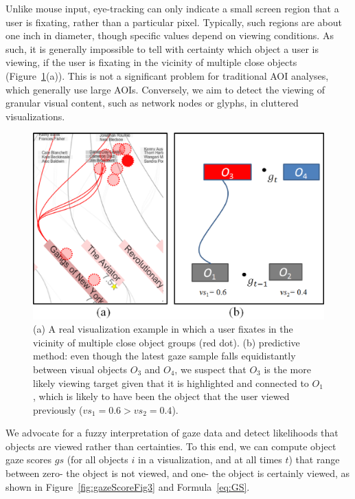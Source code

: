 Unlike mouse input, eye-tracking can only indicate a small screen region that a user is fixating, rather than a particular pixel. Typically, such regions are about one inch in diameter, though specific values depend on viewing conditions. As such, it is generally impossible to tell with certainty which object a user is viewing, if the user is fixating in the vicinity of multiple close objects (Figure~\ref{fig:discreminateFig4}(a)). This is not a significant problem for traditional AOI analyses, which generally use large AOIs. Conversely, we aim to detect the viewing of granular visual content, such as network nodes or glyphs, in cluttered visualizations.

\begin{figure}[htb]
  \centering
  \includegraphics[width=\linewidth]{images/discreminateFig4.eps}
  \caption{(a) A real visualization example in which a user fixates in the vicinity of multiple close object groups (red dot). (b) predictive method: even though the latest gaze sample falls equidistantly between visual objects $O_3$ and $O_4$, we suspect that $O_3$ is the more likely viewing target given that it is highlighted and connected to $O_1$, which is likely to have been the object that the user viewed previously ($vs_1=0.6 > vs_2 = 0.4$). }
	\label{fig:discreminateFig4}
\end{figure}

We advocate for a fuzzy interpretation of gaze data and detect likelihoods that objects are viewed rather than certainties. To this end, we can compute object gaze scores $gs$ (for all objects $i$ in a visualization, and at all times $t$) that range between zero- the object is not viewed, and one- the object is certainly viewed, as shown in Figure~\ref{fig:gazeScoreFig3} and Formula~\ref{eq:GS}. 

